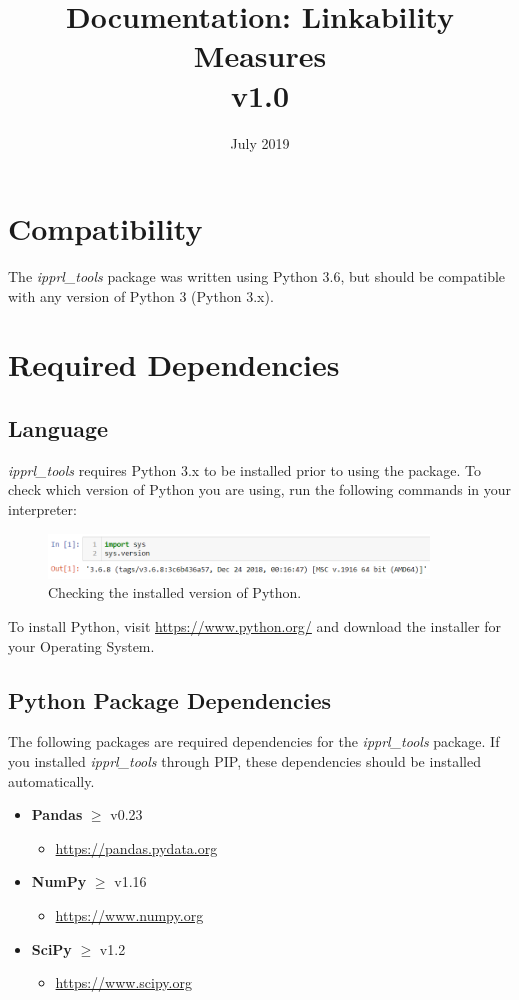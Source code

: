 \documentclass[titlepage, 11pt]{article}
\title{\pkgname{} Documentation: Linkability Measures\\v1.0}
\date{July 2019}
\newcommand{\pkgname}{\textit{ipprl\_tools}}
\begin{document}
\maketitle

\tableofcontents
\section{Compatibility}
The \pkgname{} package was written using Python 3.6, but should be compatible with any version of Python 3 (Python 3.x).

\section{Required Dependencies}

\subsection{Language}
\pkgname{} requires Python 3.x to be installed prior to using the package. To check which version of Python you are using, run the following commands in your interpreter:
\begin{figure}[H]
    \centering
    \includegraphics[width=0.9\textwidth]{imgs/Python_ver.PNG}
    \caption{Checking the installed version of Python.}
    \label{fig:pythver}
\end{figure}

\noindent To install Python, visit \url{https://www.python.org/} and download the installer for your Operating System.

\subsection{Python Package Dependencies}
The following packages are required dependencies for the \pkgname{} package. If you installed \pkgname{} through PIP, these dependencies should be installed automatically.

    \begin{itemize}
        \item \textbf{Pandas} $\geq$ v0.23
        \begin{itemize}
            \item \url{https://pandas.pydata.org}
        \end{itemize}
        \item \textbf{NumPy} $\geq$ v1.16
        \begin{itemize}
            \item \url{https://www.numpy.org}
        \end{itemize}
        \item \textbf{SciPy} $\geq$ v1.2
        \begin{itemize}
            \item \url{https://www.scipy.org}
        \end{itemize}
    \end{itemize}
\end{document}
